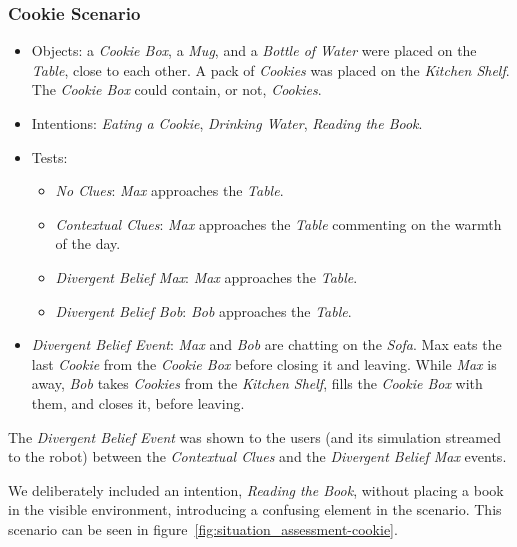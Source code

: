 \subsubsection{Cookie Scenario}
\begin{itemize}
\item Objects: a \textit{Cookie Box}, a \textit{Mug}, and a \textit{Bottle of Water} were placed on the \textit{Table}, close to each other. A pack of \textit{Cookies} was placed on the \textit{Kitchen Shelf}. The \textit{Cookie Box} could contain, or not, \textit{Cookies}.
\item Intentions: \textit{Eating a Cookie}, \textit{Drinking Water}, \textit{Reading the Book}.
\item Tests:
\begin{itemize}
	\item \textit{No Clues}: \textit{Max} approaches the \textit{Table}.
    \item \textit{Contextual Clues}: \textit{Max} approaches the \textit{Table} commenting on the warmth of the day.
	\item \textit{Divergent Belief Max}: \textit{Max} approaches the \textit{Table}.
	\item \textit{Divergent Belief Bob}: \textit{Bob} approaches the \textit{Table}.
\end{itemize}
\item  \textit{Divergent Belief Event}:  \textit{Max} and \textit{Bob} are chatting on the \textit{Sofa}. Max eats the last \textit{Cookie} from the \textit{Cookie Box} before closing it and leaving. While \textit{Max} is away, \textit{Bob} takes \textit{Cookies} from the \textit{Kitchen Shelf}, fills the \textit{Cookie Box} with them, and closes it, before leaving.
\end{itemize}

The \textit{Divergent Belief Event} was shown to the users (and its simulation streamed to the robot) between the \textit{Contextual Clues} and the \textit{Divergent Belief Max} events. 


We deliberately included an intention, \textit{Reading the Book}, without placing a book in the visible environment, introducing a confusing element in the scenario. This scenario can be seen in figure~\ref{fig:situation_assessment-cookie}.


